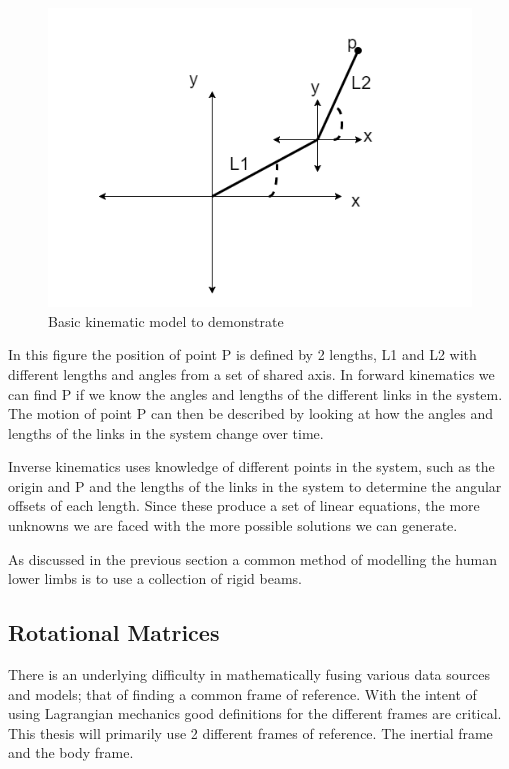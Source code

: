 \begin{figure}[!ht] 
\captionsetup{width=\linewidth, font=small}  
\includegraphics[width=\linewidth]{figures/kinematics.png}
\caption{Basic kinematic model to demonstrate}
\label{fig:kinematics}
\end{figure}

In this figure the position of point P is defined by 2 lengths, L1 and L2 with different lengths and angles from a set of shared axis. In forward kinematics we can find P if we know the angles and lengths of the different links in the system. The motion of point P can then be described by looking at  how the angles and lengths of the links in the system change over time.

Inverse kinematics uses knowledge of different points in the system, such as the origin and P and the lengths of the links in the system to determine the angular offsets of each length. Since these produce a set of linear equations, the more unknowns we are faced with the more possible solutions we can generate.

As discussed in the previous section a common method of modelling the human lower limbs is to use a collection of rigid beams. 


\subsection{Rotational Matrices}
There is an underlying difficulty in mathematically fusing various data sources and models; that of finding a common frame of reference. With the intent of using Lagrangian mechanics good definitions for the different frames are critical. This thesis will primarily use 2 different frames of reference. The inertial frame and the body frame.

